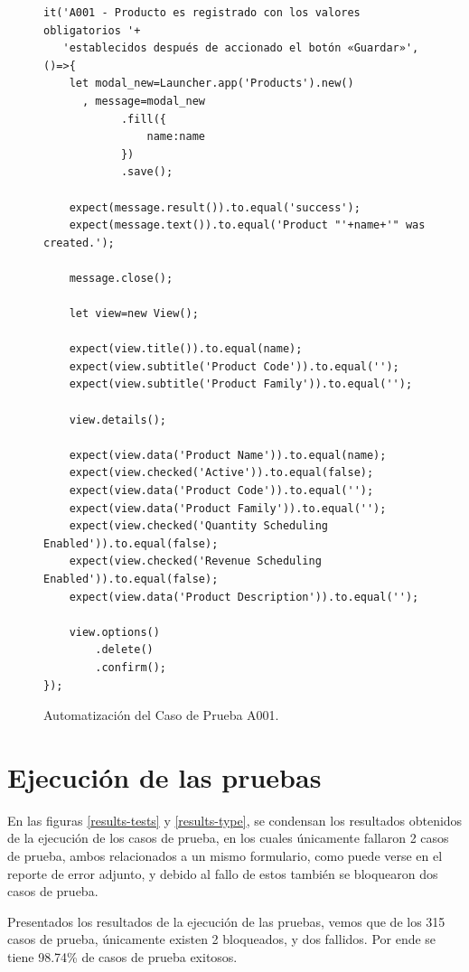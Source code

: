 \begin{figure}[H]
\begin{verbatim}
it('A001 - Producto es registrado con los valores obligatorios '+
   'establecidos después de accionado el botón «Guardar»',()=>{
    let modal_new=Launcher.app('Products').new()
      , message=modal_new
            .fill({
                name:name
            })
            .save();

    expect(message.result()).to.equal('success');
    expect(message.text()).to.equal('Product "'+name+'" was created.');

    message.close();

    let view=new View();

    expect(view.title()).to.equal(name);
    expect(view.subtitle('Product Code')).to.equal('');
    expect(view.subtitle('Product Family')).to.equal('');

    view.details();

    expect(view.data('Product Name')).to.equal(name);
    expect(view.checked('Active')).to.equal(false);
    expect(view.data('Product Code')).to.equal('');
    expect(view.data('Product Family')).to.equal('');
    expect(view.checked('Quantity Scheduling Enabled')).to.equal(false);
    expect(view.checked('Revenue Scheduling Enabled')).to.equal(false);
    expect(view.data('Product Description')).to.equal('');

    view.options()
        .delete()
        .confirm();
});
\end{verbatim}
\caption{Automatización del Caso de Prueba A001.}
\label{spec}
\end{figure}

\section{Ejecución de las pruebas}
En las figuras \ref{results-tests} y \ref{results-type}, se condensan los
resultados obtenidos de la ejecución de los casos de prueba, en los cuales
únicamente fallaron 2 casos de prueba, ambos relacionados a un mismo formulario,
como puede verse en el reporte de error adjunto, y debido al fallo de estos
también se bloquearon dos casos de prueba.

Presentados los resultados de la ejecución de las pruebas, vemos que de los 315
casos de prueba, únicamente existen 2 bloqueados, y dos fallidos. Por ende se
tiene 98.74\% de casos de prueba exitosos.

